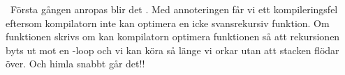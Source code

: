 \SOLUTION

\TaskSolved \what~Första gången  anropas blir det . Med annoteringen  får vi ett kompileringsfel eftersom kompilatorn inte kan optimera en icke svansrekursiv funktion. Om funktionen skrivs om kan kompilatorn optimera funktionen så att rekursionen byts ut mot en -loop och vi kan köra så länge vi orkar utan att stacken flödar över. Och himla snabbt går det!!

\QUESTEND
